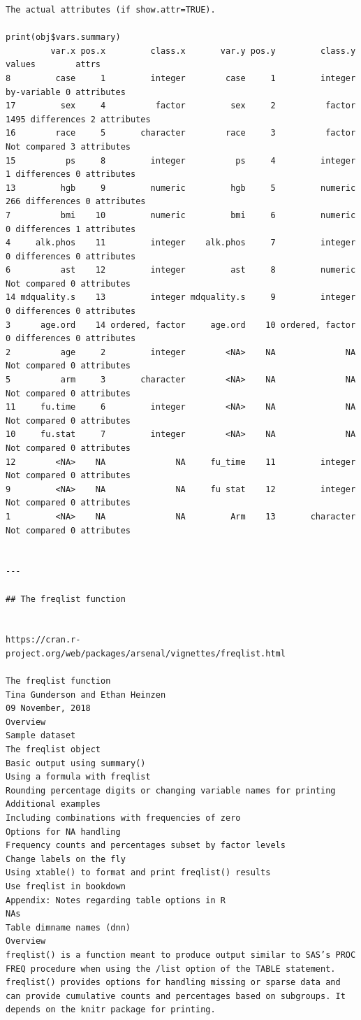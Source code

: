 \documentclass[
]{book}
\begin{document}
\begin{verbatim}
The actual attributes (if show.attr=TRUE).

print(obj$vars.summary)
         var.x pos.x         class.x       var.y pos.y         class.y           values        attrs
8         case     1         integer        case     1         integer      by-variable 0 attributes
17         sex     4          factor         sex     2          factor 1495 differences 2 attributes
16        race     5       character        race     3          factor     Not compared 3 attributes
15          ps     8         integer          ps     4         integer    1 differences 0 attributes
13         hgb     9         numeric         hgb     5         numeric  266 differences 0 attributes
7          bmi    10         numeric         bmi     6         numeric    0 differences 1 attributes
4     alk.phos    11         integer    alk.phos     7         integer    0 differences 0 attributes
6          ast    12         integer         ast     8         numeric     Not compared 0 attributes
14 mdquality.s    13         integer mdquality.s     9         integer    0 differences 0 attributes
3      age.ord    14 ordered, factor     age.ord    10 ordered, factor    0 differences 0 attributes
2          age     2         integer        <NA>    NA              NA     Not compared 0 attributes
5          arm     3       character        <NA>    NA              NA     Not compared 0 attributes
11     fu.time     6         integer        <NA>    NA              NA     Not compared 0 attributes
10     fu.stat     7         integer        <NA>    NA              NA     Not compared 0 attributes
12        <NA>    NA              NA     fu_time    11         integer     Not compared 0 attributes
9         <NA>    NA              NA     fu stat    12         integer     Not compared 0 attributes
1         <NA>    NA              NA         Arm    13       character     Not compared 0 attributes


---

## The freqlist function


https://cran.r-project.org/web/packages/arsenal/vignettes/freqlist.html

The freqlist function
Tina Gunderson and Ethan Heinzen
09 November, 2018
Overview
Sample dataset
The freqlist object
Basic output using summary()
Using a formula with freqlist
Rounding percentage digits or changing variable names for printing
Additional examples
Including combinations with frequencies of zero
Options for NA handling
Frequency counts and percentages subset by factor levels
Change labels on the fly
Using xtable() to format and print freqlist() results
Use freqlist in bookdown
Appendix: Notes regarding table options in R
NAs
Table dimname names (dnn)
Overview
freqlist() is a function meant to produce output similar to SAS’s PROC FREQ procedure when using the /list option of the TABLE statement. freqlist() provides options for handling missing or sparse data and can provide cumulative counts and percentages based on subgroups. It depends on the knitr package for printing.


\end{verbatim}
\end{document}
